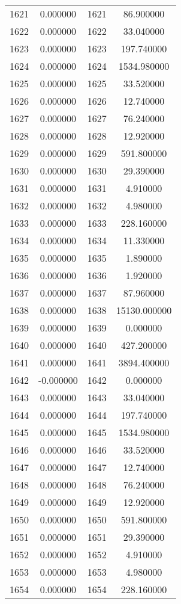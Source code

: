 \documentclass[12pt]{article}
\begin{document}
\begin{longtable}{@{}cccc@{}}
1621 & 0.000000 & 1621 & 86.900000 \\
1622 & 0.000000 & 1622 & 33.040000 \\
1623 & 0.000000 & 1623 & 197.740000 \\
1624 & 0.000000 & 1624 & 1534.980000 \\
1625 & 0.000000 & 1625 & 33.520000 \\
1626 & 0.000000 & 1626 & 12.740000 \\
1627 & 0.000000 & 1627 & 76.240000 \\
1628 & 0.000000 & 1628 & 12.920000 \\
1629 & 0.000000 & 1629 & 591.800000 \\
1630 & 0.000000 & 1630 & 29.390000 \\
1631 & 0.000000 & 1631 & 4.910000 \\
1632 & 0.000000 & 1632 & 4.980000 \\
1633 & 0.000000 & 1633 & 228.160000 \\
1634 & 0.000000 & 1634 & 11.330000 \\
1635 & 0.000000 & 1635 & 1.890000 \\
1636 & 0.000000 & 1636 & 1.920000 \\
1637 & 0.000000 & 1637 & 87.960000 \\
1638 & 0.000000 & 1638 & 15130.000000 \\
1639 & 0.000000 & 1639 & 0.000000 \\
1640 & 0.000000 & 1640 & 427.200000 \\
1641 & 0.000000 & 1641 & 3894.400000 \\
1642 & -0.000000 & 1642 & 0.000000 \\
1643 & 0.000000 & 1643 & 33.040000 \\
1644 & 0.000000 & 1644 & 197.740000 \\
1645 & 0.000000 & 1645 & 1534.980000 \\
1646 & 0.000000 & 1646 & 33.520000 \\
1647 & 0.000000 & 1647 & 12.740000 \\
1648 & 0.000000 & 1648 & 76.240000 \\
1649 & 0.000000 & 1649 & 12.920000 \\
1650 & 0.000000 & 1650 & 591.800000 \\
1651 & 0.000000 & 1651 & 29.390000 \\
1652 & 0.000000 & 1652 & 4.910000 \\
1653 & 0.000000 & 1653 & 4.980000 \\
1654 & 0.000000 & 1654 & 228.160000 \\

\end{longtable}
\end{document}
